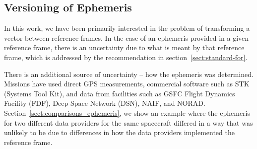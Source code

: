 \documentclass[draft]{agujournal2019}
\begin{document}












\subsection{Versioning of Ephemeris}
\label{ephemeris-version}

In this work, we have been primarily interested in the problem of transforming a vector between reference frames. In the case of an ephemeris provided in a given reference frame, there is an uncertainty due to what is meant by that reference frame, which is addressed by the recommendation in section~\ref{sect:standard-for}.

There is an additional source of uncertainty -- how the ephemeris was determined. Missions have used direct GPS measurements, commercial software such as STK (Systems Tool Kit), and data from facilities such as GSFC Flight Dynamics Facility (FDF), Deep Space Network (DSN), NAIF, and NORAD. Section~\ref{sect:comparisons_ephemeris}, we show an example where the ephemeris for two different data providers for the same spacecraft differed in a way that was unlikely to be due to differences in how the data providers implemented the reference frame. 
\end{document}
